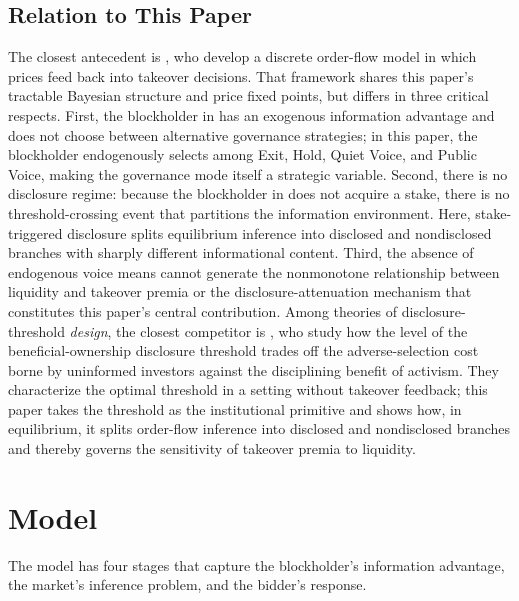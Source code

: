 \documentclass[11pt]{article}
\newcommand{\1}{\mathbf{1}}
\begin{document}
%
\subsection{Relation to This Paper}
%

The closest antecedent is \citet{EdmansGoldsteinJiang2015}, who develop a discrete order-flow model in which prices feed back into takeover decisions. That framework shares this paper's tractable Bayesian structure and price fixed points, but differs in three critical respects. First, the blockholder in \citet{EdmansGoldsteinJiang2015} has an exogenous information advantage and does not choose between alternative governance strategies; in this paper, the blockholder endogenously selects among Exit, Hold, Quiet Voice, and Public Voice, making the governance mode itself a strategic variable. Second, there is no disclosure regime: because the blockholder in \citet{EdmansGoldsteinJiang2015} does not acquire a stake, there is no threshold-crossing event that partitions the information environment. Here, stake-triggered disclosure splits equilibrium inference into disclosed and nondisclosed branches with sharply different informational content. Third, the absence of endogenous voice means \citet{EdmansGoldsteinJiang2015} cannot generate the nonmonotone relationship between liquidity and takeover premia or the disclosure-attenuation mechanism that constitutes this paper's central contribution. Among theories of disclosure-threshold \emph{design}, the closest competitor is \citet{OrdonezCalafiBernhardt2022}, who study how the level of the beneficial-ownership disclosure threshold trades off the adverse-selection cost borne by uninformed investors against the disciplining benefit of activism. They characterize the optimal threshold in a setting without takeover feedback; this paper takes the threshold as the institutional primitive and shows how, in equilibrium, it splits order-flow inference into disclosed and nondisclosed branches and thereby governs the sensitivity of takeover premia to liquidity.
\section{Model}
\label{sec:model}

The model has four stages that capture the blockholder's information advantage, the market's inference problem, and the bidder's response.
\end{document}
